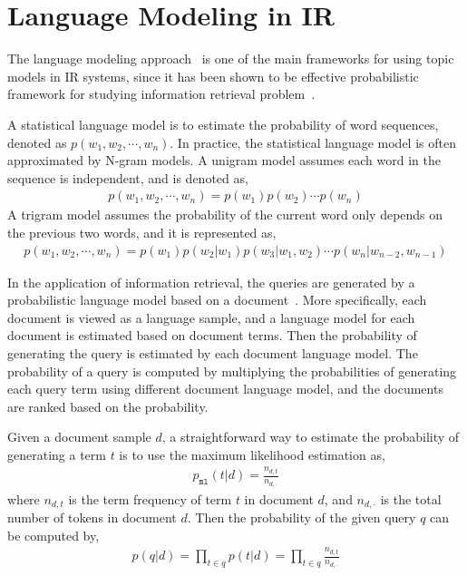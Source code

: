 \section{Language Modeling in IR}

The language modeling approach~\citep{croft-03,PonteCroft,song-99} is one of the main frameworks for using topic models in IR systems, since it has been shown to be effective probabilistic framework for studying information retrieval problem~\citep{PonteCroft,berger-99}.

A statistical language model is to estimate the probability of word sequences, denoted as $p(w_1,w_2,\cdots,w_n)$. In practice, the statistical language model is often approximated by N-gram models. A unigram model assumes each word in the sequence is independent, and is denoted as,
\begin{align}
p(w_1,w_2,\cdots,w_n) = p(w_1)p(w_2) \cdots p(w_n)
\end{align}
A trigram model assumes the probability of the current word only depends on the previous two words, and it is represented as,
\begin{align}
p(w_1,w_2,\cdots,w_n)=p(w_1)p(w_2|w_1)p(w_3|w_1,w_2)\cdots p(w_n|w_{n-2},w_{n-1})
\end{align}

In the application of information retrieval, the queries are generated by a probabilistic language model based on a document~\citep{zhai-01}. More specifically, each document is viewed as a language sample, and a language model for each document is estimated based on document terms. Then the probability of generating the query is estimated by each document language model. The probability of a query is computed by multiplying the probabilities of generating each query term using different document language model, and the documents are ranked based on the probability. 

Given a document sample $d$, a straightforward way to estimate the probability of generating a term $t$ is to use the maximum likelihood estimation as,
\begin{align}
p_{\texttt{ml}}(t|d) = \frac{n_{d,t}}{n_{d,\cdot}}
\label{eq:ir_mse}
\end{align}
where $n_{d,t}$ is the term frequency of term $t$ in document $d$, and $n_{d,\cdot}$ is the total number of tokens in document $d$. Then the probability of the given query $q$ can be computed by,
\begin{align}
p(q|d) = \prod_{t \in q} p(t|d) = \prod_{t \in q} \frac{n_{d,t}}{n_{d,\cdot}}
\end{align}

